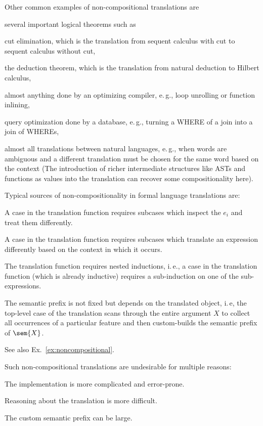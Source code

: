 Other common examples of non-compositional translations are
\begin{compactitem}
 \item several important logical theorems such as
  \begin{compactitem}
   \item cut elimination, which is the translation from sequent calculus with cut to sequent calculus without cut,
   \item the deduction theorem, which is the translation from natural deduction to Hilbert calculus,
  \end{compactitem}
 \item almost anything done by an optimizing compiler, e.\,g., loop unrolling or function inlining,
 \item query optimization done by a database, e.\,g., turning a WHERE of a join into a join of WHEREs,
 \item almost all translations between natural languages, e.\,g., when words are ambiguous and a different translation must be chosen for the same word based on the context (The introduction of richer intermediate structures like ASTs and functions as values into the translation can recover some compositionality here).
\end{compactitem}

Typical sources of non-compositionality in formal language translations are:
\begin{compactitem}
 \item A case in the translation function requires subcases which inspect the $e_i$ and treat them differently.
 \item A case in the translation function requires subcases which translate an expression differently based on the context in which it occurs.
 \item The translation function requires nested inductions, i.\,e., a case in the translation function (which is already inductive) requires a sub-induction on one of the sub-expressions.
 \item The semantic prefix is not fixed but depends on the translated object, i.\,e, the top-level case of the translation scans through the entire argument $X$ to collect all occurrences of a particular feature and then custom-builds the semantic prefix of $\sem{X}$.
\end{compactitem}
See also Ex.~\ref{ex:noncompositional}.

Such non-compositional translations are undesirable for multiple reasons:
\begin{compactitem}
 \item The implementation is more complicated and error-prone.
 \item Reasoning about the translation is more difficult.
 \item The custom semantic prefix can be large.
\end{compactitem}

